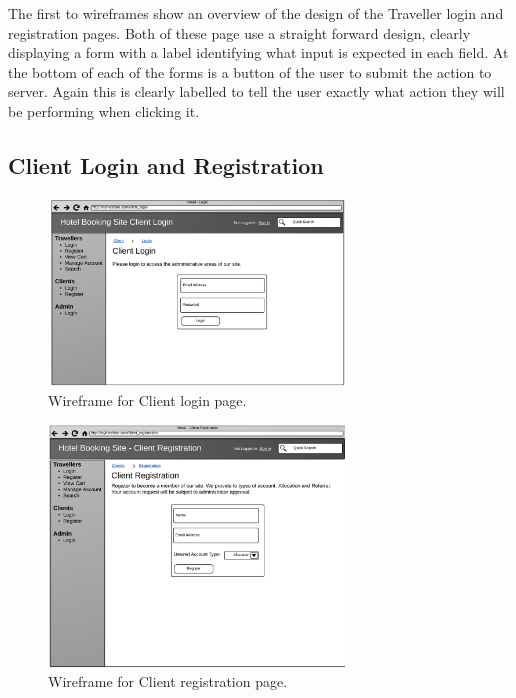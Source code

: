 \documentclass{article}
\begin{document}
The first to wireframes show an overview of the design of the Traveller login and registration pages. Both of these page use a straight forward design, clearly displaying a form with a label identifying what input is expected in each field. At the bottom of each of the forms is a button of the user to submit the action to server. Again this is clearly labelled to tell the user exactly what action they will be performing when clicking it.

\subsection{Client Login and Registration}
\begin{figure}[H]
\centering
\includegraphics[width=0.7\textwidth]{img/wireframes/ClientLogin.png}
\caption{Wireframe for Client login page.}
\label{fig:wireframe-client-login}
\end{figure}

\begin{figure}[H]
\centering
\includegraphics[width=0.7\textwidth]{img/wireframes/ClientRegister.png}
\caption{Wireframe for Client registration page.}
\label{fig:wireframe-client-register}
\end{figure}
\end{document}
